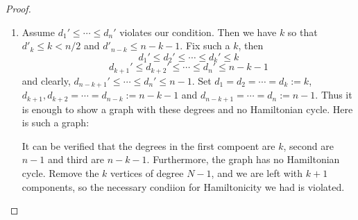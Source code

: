 \documentclass[12pt, a4paper]{book}
\theoremstyle{nonumberplain}
\newtheorem{proof}{Proof}
\begin{document}
\begin{proof}
\begin{enumerate}[label=(\roman*)]
            Now consider the vertices $x$ which are not neighbours of $b$.
            Since $\{x,b\}$ is a non-adjacent pair of $b$ which is not maximal, we must have $d(x)\leq d(a)=h$.
            Furthermore, from the Ore proof argument, we know that the number of non-neighbours of $b$ is at least as large as $d(a)=h$, so there are at least $h$ vertices with $d(x)\leq h$.
            Thus $d_h\leq h$ and we have our claim.

            Thus by our condition, $d_{n-h}\geq n-h$, so there exist $h+1$ vertices with degree at least $n-h$.
            Since $d(a)=h$, there exists some non-neighbour $y$ of $a$ with $d(y)\geq n-h$.
            But then $\{a,y\}$ is a non-adjacent pair with $d(a)+d(y)\geq h+n-h=n>d(a)+d(b)$, a contradiction to the choice of $\{a,b\}$.
        \item Assume $d_1'\leq\cdots\leq d_n'$ violates our condition.
            Then we have $k$ so that $d'_k\leq k<n/2$ and $d'_{n-k}\leq n-k-1$.
            Fix such a $k$, then
            \[d_1'\leq d_2'\leq\cdots\leq d_k'\leq k\]
            \[d_{k+1}'\leq d_{k+2}'\leq\cdots\leq d_n'\leq n-k-1\]
            and clearly, $d_{n-k+1}'\leq\cdots\leq d_n'\leq n-1$.
            Set $d_1=d_2=\cdots=d_k:= k$, $d_{k+1},d_{k+2}=\cdots=d_{n-k}:=n-k-1$ and $d_{n-k+1}=\cdots=d_n:=n-1$.
            Thus it is enough to show a graph with these degrees and no Hamiltonian cycle.
            Here is such a graph:
            \begin{center}
            \end{center}
            It can be verified that the degrees in the first compoent are $k$, second are $n-1$ and third are $n-k-1$.
            Furthermore, the graph has no Hamiltonian cycle.
            Remove the $k$ vertices of degree $N-1$, and we are left with $k+1$ components, so the necessary condiion for Hamiltonicity we had is violated.
    \end{enumerate}
\end{proof}
\end{document}
